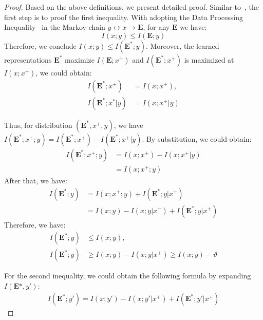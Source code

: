 \documentclass{article}
\theoremstyle{plain}
\theoremstyle{definition}
\theoremstyle{remark}
\begin{document}
\begin{proof}
Based on the above definitions, we present detailed proof. Similar to~\cite{tsai2020self}, the first step is to proof the first inequality. With adopting the Data Processing Inequality~\cite{cover1999elements} in the Markov chain $y \leftrightarrow  x  \to  \textbf{E}$, for any $\textbf{E}$ we have:
\begin{equation}
I(x;y)\le I(\textbf{E};y)
\end{equation}
Therefore, we conclude $I(x;y)\le I(\textbf{E}^*;y)$. Moreover, the learned representations $\textbf{E}^*$ maximize $I(\textbf{E}; x^+)$ and $I(\textbf{E}^*;x^+)$ is maximized at $I(x;x^+)$, we could obtain:
\begin{equation}
\begin{aligned}
I(\textbf{E}^*;x^+) &= I(x;x^+),\\
I(\textbf{E}^*;x^*|y) &= I(x;x^+|y)
\end{aligned}
\end{equation}

Thus, for distribution $(\textbf{E}^*, x^+, y)$, we have $I(\textbf{E}^*;x^+;y) = I(\textbf{E}^*; x^+) - I(\textbf{E}^*; x^+|y)$. By substitution, we could obtain: 
\begin{equation}
\begin{aligned}
I(\textbf{E}^*;x^+;y) &= I(x;x^+)-I(x;x^+|y)\\
                      &=I(x;x^+;y)
\end{aligned}
\end{equation}
After that, we have:
\begin{equation}
\begin{aligned}
I(\textbf{E}^*;y) &= I(x;x^+;y) + I(\textbf{E}^*; y|x^+)\\
&=I(x;y) - I(x;y|x^+) + I(\textbf{E}^*; y|x^+)
\end{aligned}
\end{equation}
Therefore, we have:
\begin{equation}
\begin{aligned}
I(\textbf{E}^*;y) &\le I(x;y),\\
I(\textbf{E}^*;y) &\ge  I(x;y) - I(x;y|x^+) \ge I(x;y)-\vartheta
\end{aligned}
\end{equation}

For the second inequality, we could obtain the following formula by expanding $I(\textbf{E}*, y')$:
\begin{equation}
\begin{aligned}
I(\textbf{E}^*;y') = I(x;y')-I(x;y'|x^+) + I(\textbf{E}^*;y'|x^+)
\end{aligned}
\end{equation}


\end{proof}
\end{document}
